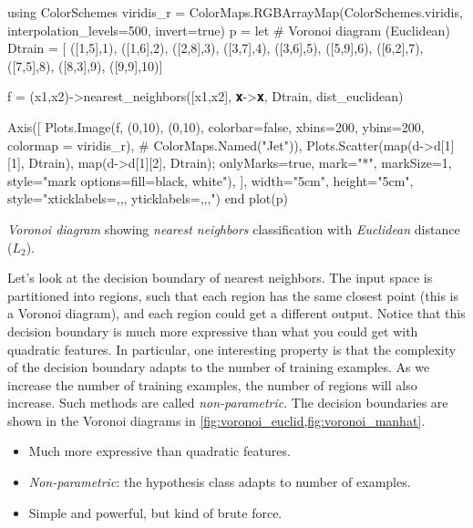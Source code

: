 \begin{marginfigure}[-6mm]
\begin{jlcode}
using ColorSchemes
viridis_r = ColorMaps.RGBArrayMap(ColorSchemes.viridis, interpolation_levels=500, invert=true)
p = let
	# Voronoi diagram (Euclidean)
	Dtrain = [
	    ([1,5],1), 
	    ([1,6],2), 
	    ([2,8],3), 
	    ([3,7],4), 
	    ([3,6],5), 
	    ([5,9],6), 
	    ([6,2],7),
	    ([7,5],8), 
	    ([8,3],9), 
	    ([9,9],10)]

	f = (x1,x2)->nearest_neighbors([x1,x2], 𝐱->𝐱, Dtrain, dist_euclidean) 

	Axis([
	    Plots.Image(f, (0,10), (0,10), colorbar=false, xbins=200, ybins=200, colormap = viridis_r), # ColorMaps.Named("Jet")),
	    Plots.Scatter(map(d->d[1][1], Dtrain), map(d->d[1][2], Dtrain); 
	        onlyMarks=true, mark="*", markSize=1, style="mark options={fill=black}, white"),
	], width="5cm", height="5cm", style="xticklabels={,,}, yticklabels={,,},")
end
plot(p)
\end{jlcode}
\begin{center}
\end{center}
\caption{
	\label{fig:voronoi_euclid} \textit{Voronoi diagram} showing \textit{nearest neighbors} classification with \textit{Euclidean} distance ($L_2$).
}
\end{marginfigure}
Let's look at the decision boundary of nearest neighbors.
% 
The input space is partitioned into regions, such that each region has the same closest point (this is a Voronoi diagram), and each region could get a different output.
%
Notice that this decision boundary is much more expressive than what you could get with quadratic features.
%
In particular, one interesting property is that the complexity of the decision boundary adapts to the number of training examples.
%
As we increase the number of training examples, the number of regions will also increase.
%
Such methods are called \textit{non-parametric}.
The decision boundaries are shown in the Voronoi diagrams in \cref{fig:voronoi_euclid,fig:voronoi_manhat}.
\begin{itemize}
\item Much more expressive than quadratic features.
\item \textit{Non-parametric}: the hypothesis class adapts to number of examples.
\item Simple and powerful, but kind of brute force.
\end{itemize}



